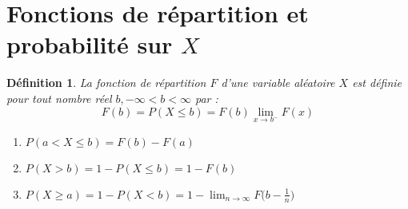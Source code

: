 \documentclass{article}
\newtheorem*{mydef}{Définition}
\begin{document}
	\section*{Fonctions de répartition et probabilité sur $X$}
	\begin{mydef}
		La fonction de répartition \(F\) d'une variable aléatoire \(X\) est définie pour tout nombre réel \(b,-\infty<b<\infty\) par :
		\[F(b)=P(X\leq b)=F(b)\lim_{x\to b^-} F(x)\]
		\begin{enumerate}
			\item \(P(a<X\leq b)=F(b)-F(a)\)
			\item \(P(X>b)=1-P(X\leq b)=1-F(b)\)
			\item \(P(X\geq a)=1-P(X<b)=1-\lim_{n\to\infty} F\Big(b-\frac{1}{n}\Big)\)
		\end{enumerate}
	\end{mydef}
\end{document}
